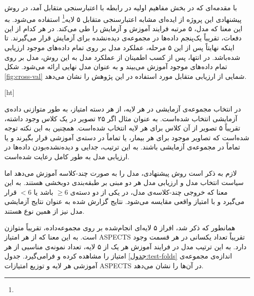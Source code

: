 
با مقدمه‌ای که در بخش مفاهیم اولیه در رابطه با اعتبارسنجی متقابل آمد، در روش پیشنهادی این پروژه از ایده‌ای مشابه 
اعتبارسنجی متقابل ۵ لایه\footnote{}
استفاده می‌شود.
به این معنا که مدل، ۵ مرتبه فرایند آموزش و آزمایش را طی می‌کند.
 در هر کدام از این دفعات، تقریباً یک‌پنجم داده‌ها در مجموعه‌ی دیده‌نشده برای آزمایش قرار می‌گیرند.
 تا اینکه نهایتاً پس از این ۵ مرحله، عملکرد مدل بر روی تمام داده‌های موجود ارزیابی شده‌باشد.
 در انتها، پس از کسب اطمینان از عملکرد مدل به این روش، مدل بر روی تمام داده‌های موجود آموزش می‌بیند و به عنوان مدل نهایی ارائه می‌شود.
 شکل \ref{fig:cross-val}
 شمایی از ارزیابی متقابل مورد استفاده در این پژوهش را نشان می‌دهد.

[ht]
\vspace{0.5cm}


\vspace{0.5cm}

در انتخاب مجموعه‌ی آزمایشی در هر لایه، از هر دسته امتیاز، به طور متوازنی داده‌ی آزمایشی انتخاب شده‌است.
به عنوان مثال اگر ۲۵ تصویر در یک کلاس وجود داشته، تقریباً ۵ تصویر از آن کلاس برای هر لایه انتخاب شده‌است.
همچنین به این نکته توجه شده‌است که تصاویر موجود برای هر بیمار، یا تماماً در دسته‌ی آموزشی قرار بگیرند و یا تماماً در مجموعه‌ی آزمایشی باشند.
به این ترتیب، جدایی و  دیده‌نشده‌بودن داده‌ها در ارزیابی مدل به طور کامل رعایت شده‌است.

لازم به ذکر است
روش پیشنهادی، مدل را به صورت چند-کلاسه آموزش می‌دهد اما سیاست انتخاب مدل و ارزیابی مدل هر دو مبنی بر طبقه‌بندی دو‌بخشی هستند.
به این معنا که خروجی چند-کلاسه‌ی مدل، 
در یکی از دو دسته‌ی 
$\geq 6$ باشد یا $< 6$
قرار می‌گیرد و با امتیاز واقعی مقایسه می‌شود.
نتایج گزارش شده به عنوان نتایج آزمایشی مدل نیز از همین نوع هستند. 

همانطور که ذکر شد،
افراز ۵ لایه‌ای انجام‌شده بر روی مجموعه‌داده، تقریباً متوازن است.
به این معنا که از هر امتیاز ASPECTS تقریباً تعداد یکسانی در هر قسمت وجود دارد.
به این ترتیب مدل در فرایند آموزش هر یک از ۵ لایه، تعداد نمونه‌ی مناسبی از هر امتیاز را مشاهده کرده و فرامی‌گیرد.
جدول \ref{جدول:test-folds} اندازه‌ی مجموعه‌ی آموزشی هر لایه و توزیع امتیازات ASPECTS در آن‌ها را نشان می‌دهد.

